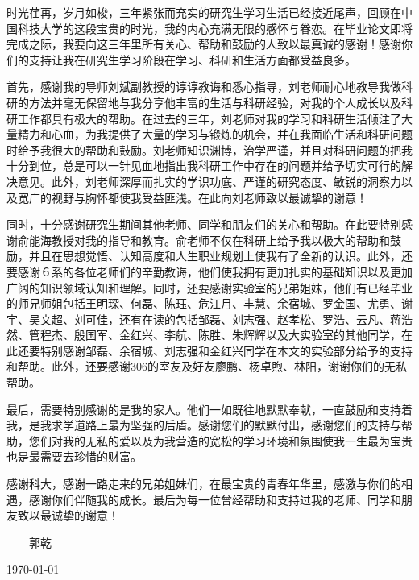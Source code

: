 ﻿
\begin{thanks}

\par 时光荏苒，岁月如梭，三年紧张而充实的研究生学习生活已经接近尾声，回顾在中国科技大学的这段宝贵的时光，我的内心充满无限的感怀与眷恋。在毕业论文即将完成之际，我要向这三年里所有关心、帮助和鼓励的人致以最真诚的感谢！感谢你们的支持让我在研究生学习阶段在学习、科研和生活方面都受益良多。
\par 首先，感谢我的导师刘斌副教授的谆谆教诲和悉心指导，刘老师耐心地教导我做科研的方法并毫无保留地与我分享他丰富的生活与科研经验，对我的个人成长以及科研工作都具有极大的帮助。在过去的三年，刘老师对我的学习和科研生活倾注了大量精力和心血，为我提供了大量的学习与锻炼的机会，并在我面临生活和科研问题时给予我很大的帮助和鼓励。刘老师知识渊博，治学严谨，并且对科研问题的把我十分到位，总是可以一针见血地指出我科研工作中存在的问题并给予切实可行的解决意见。此外，刘老师深厚而扎实的学识功底、严谨的研究态度、敏锐的洞察力以及宽广的视野与胸怀都使我受益匪浅。在此向刘老师致以最诚挚的谢意！
\par 同时，十分感谢研究生期间其他老师、同学和朋友们的关心和帮助。在此要特别感谢俞能海教授对我的指导和教育。俞老师不仅在科研上给予我以极大的帮助和鼓励，并且在思想觉悟、认知高度和人生职业规划上使我有了全新的认识。此外，还要感谢６系的各位老师们的辛勤教诲，他们使我拥有更加扎实的基础知识以及更加广阔的知识领域认知和理解。同时，还要感谢实验室的兄弟姐妹，他们有已经毕业的师兄师姐包括王明琛、何磊、陈珏、危江月、丰慧、余宿城、罗金国、尤勇、谢宇、吴文超、刘可佳，还有在读的包括邹磊、刘志强、赵孝松、罗浩、云凡、蒋浩然、管程杰、殷国军、金红兴、李航、陈胜、朱辉辉以及大实验室的其他同学，在此还要特别感谢邹磊、余宿城、刘志强和金红兴同学在本文的实验部分给予的支持和帮助。此外，还要感谢306的室友及好友廖鹏、杨卓煦、林阳，谢谢你们的无私帮助。
\par 最后，需要特别感谢的是我的家人。他们一如既往地默默奉献，一直鼓励和支持着我，是我求学道路上最为坚强的后盾。感谢您们的默默付出，感谢您们的支持与帮助，您们对我的无私的爱以及为我营造的宽松的学习环境和氛围使我一生最为宝贵也是最需要去珍惜的财富。
\par 感谢科大，感谢一路走来的兄弟姐妹们，在最宝贵的青春年华里，感激与你们的相遇，感谢你们伴随我的成长。最后为每一位曾经帮助和支持过我的老师、同学和朋友致以最诚挚的谢意！

\vskip 10pt

\begin{flushright}
~~~~郭乾~~~~

\today

\end{flushright}
\end{thanks}
